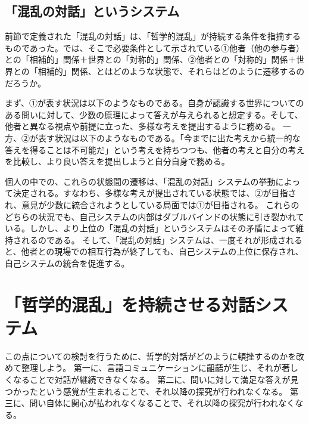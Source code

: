 \documentclass[b5j,twoside,twocolumn]{utarticle}
\begin{document}
\subsection{「混乱の対話」というシステム}
前節で定義された「混乱の対話」は、「哲学的混乱」が持続する条件を指摘するものであった。では、そこで必要条件として示されている①他者（他の参与者）との「相補的」関係＋世界との「対称的」関係、②他者との「対称的」関係＋世界との「相補的」関係、とはどのような状態で、それらはどのように遷移するのだろうか。


まず、①が表す状況は以下のようなものである。自身が認識する世界についてのある問いに対して、少数の原理によって答えが与えられると想定する。そして、他者と異なる視点や前提に立った、多様な考えを提出するように務める。
一方、②が表す状況は以下のようなものである。「今までに出た考えから統一的な答えを得ることは不可能だ」という考えを持ちつつも、他者の考えと自分の考えを比較し、より良い答えを提出しようと自分自身で務める。


個人の中での、これらの状態間の遷移は、「混乱の対話」システムの挙動によって決定される。すなわち、多様な考えが提出されている状態では、②が目指され、意見が少数に統合されようとしている局面では①が目指される。
これらのどちらの状況でも、自己システムの内部はダブルバインドの状態に引き裂かれている。しかし、より上位の「混乱の対話」というシステムはその矛盾によって維持されるのである。
そして、「混乱の対話」システムは、一度それが形成されると、他者との現場での相互行為が終了しても、自己システムの上位に保存され、自己システムの統合を促進する。



\section{「哲学的混乱」を持続させる対話システム}






この点についての検討を行うために、哲学的対話がどのように頓挫するのかを改めて整理しよう。
第一に、言語コミュニケーションに齟齬が生じ、それが著しくなることで対話が継続できなくなる。
第二に、問いに対して満足な答えが見つかったという感覚が生まれることで、それ以降の探究が行われなくなる。
第三に、問い自体に関心が払われなくなることで、それ以降の探究が行われなくなる。
\end{document}
